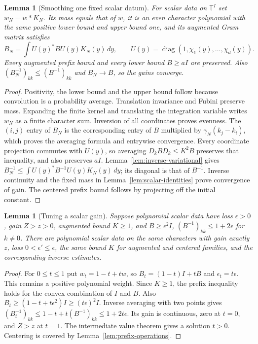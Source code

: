 \documentclass[reqno,a4paper,12pt]{amsart}
\newtheorem{lemma}[theorem]{Lemma}
\theoremstyle{definition}
\newcommand{\T}{\mathbb T}
\newcommand{\diag}{\operatorname{diag}}
\begin{document}
\begin{lemma}[Smoothing one fixed scalar datum]\label{lem:smoothing}
For scalar data on $\T^I$ set $w_N=w*K_N$. Its mass equals that of $w$,
it is an even character polynomial with the same positive lower bound
and upper bound one, and its augmented Gram matrix satisfies
\[
 B_N=\int U(y)^*BU(y)K_N(y)\,dy,\qquad
 U(y)=\diag(1,\chi_1(y),\ldots,\chi_d(y)).
\]
Every augmented prefix bound and every lower bound $B\ge aI$
are preserved. Also $(B_N^{-1})_{kk}\le(B^{-1})_{kk}$ and
$B_N\to B$, so the gains converge.
\end{lemma}
\begin{proof}
Positivity, the lower bound and the upper bound follow because convolution
is a probability average. Translation invariance and Fubini preserve
mass. Expanding the finite kernel and translating the integration
variable writes $w_N$ as a finite character sum. Inversion of all
coordinates proves evenness.
The $(i,j)$ entry of $B_N$ is the corresponding entry of $B$
multiplied by $\gamma_N(k_j-k_i)$, which proves the averaging formula
and entrywise convergence.
Every coordinate projection commutes with $U(y)$, so averaging
$D_kBD_k\le K^2B$ preserves that inequality, and also preserves $aI$.
Lemma~\ref{lem:inverse-variational} gives
$B_N^{-1}\le\int U(y)^*B^{-1}U(y)K_N(y)\,dy$;
its diagonal is that of $B^{-1}$.
Inverse continuity and the fixed mass in
Lemma~\ref{lem:scalar-identities} prove convergence of gain.
The centered prefix bound follows by projecting off the initial constant.
\end{proof}

\begin{lemma}[Tuning a scalar gain]\label{lem:tuning}
Suppose polynomial scalar data have loss $\epsilon>0$, gain $Z>z>0$,
augmented bound $K\ge1$, and
$B\ge\epsilon^2I$, $(B^{-1})_{kk}\le1+2\epsilon$ for $k\ne0$.
There are polynomial scalar data on the same characters with gain
exactly $z$, loss $0<\epsilon'\le\epsilon$, the same bound $K$ for
augmented and centered families, and the corresponding inverse estimates.
\end{lemma}
\begin{proof}
For $0\le t\le1$ put $w_t=1-t+tw$, so
$B_t=(1-t)I+tB$ and $\epsilon_t=t\epsilon$.
This remains a positive polynomial weight. Since $K\ge1$,
the prefix inequality holds for the convex combination of $I$ and $B$.
Also $B_t\ge(1-t+t\epsilon^2)I\ge(t\epsilon)^2I$.
Inverse averaging with two points gives
$(B_t^{-1})_{kk}\le1-t+t(B^{-1})_{kk}\le1+2t\epsilon$.
Its gain is continuous, zero at $t=0$, and $Z>z$ at $t=1$.
The intermediate value theorem gives a solution $t>0$.
Centering is covered by Lemma~\ref{lem:prefix-operations}.
\end{proof}
\end{document}
